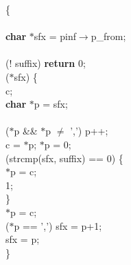 \begin{flushleft}
\{\mbox{}\\
\mbox{}\\
\hspace*{3\indentation}{\bf register} {\bf char} $\ast$sfx = pinf$\rightarrow$p\_from;\mbox{}\\
\mbox{}\\
\hspace*{3\indentation}{\bf if} (! suffix) {\bf return} 0;\mbox{}\\
\hspace*{3\indentation}{\bf while} ($\ast$sfx) \{\mbox{}\\
\hspace*{6\indentation}{\bf char} c;\mbox{}\\
\hspace*{6\indentation}{\bf register} {\bf char} $\ast$p = sfx;\mbox{}\\
\mbox{}\\
\hspace*{6\indentation}{\bf while} ($\ast$p \&\& $\ast$p $\neq$ ',') p++;\mbox{}\\
\hspace*{6\indentation}c = $\ast$p; $\ast$p = 0;\mbox{}\\
\hspace*{6\indentation}{\bf if} (strcmp(sfx, suffix) == 0) \{\mbox{}\\
\hspace*{9\indentation}$\ast$p = c;\mbox{}\\
\hspace*{9\indentation}{\bf return} 1;\mbox{}\\
\hspace*{6\indentation}\}\mbox{}\\
\hspace*{6\indentation}$\ast$p = c;\mbox{}\\
\hspace*{6\indentation}{\bf if} ($\ast$p == ',') sfx = p+1;\mbox{}\\
\hspace*{6\indentation}{\bf else} sfx = p;\mbox{}\\
\hspace*{3\indentation}\}\mbox{}\\

\end{flushleft}
